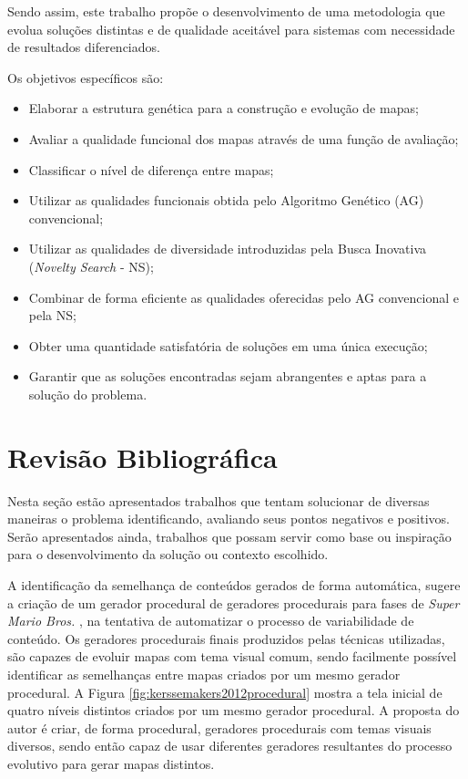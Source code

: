 Sendo assim, este trabalho propõe o desenvolvimento de uma metodologia que evolua soluções distintas e de qualidade aceitável para sistemas com necessidade de resultados diferenciados.

Os objetivos específicos são:

\vspace{-5mm}
\begin{itemize}[leftmargin=1.25\parindent]
    \item Elaborar a estrutura genética para a construção e evolução de mapas;
    \item Avaliar a qualidade funcional dos mapas através de uma função de avaliação;
    \item Classificar o nível de diferença entre mapas;
    \item Utilizar as qualidades funcionais obtida pelo Algoritmo Genético (AG) convencional;
    \item Utilizar as qualidades de diversidade introduzidas pela Busca Inovativa (\emph{Novelty Search} - NS);
    \item Combinar de forma eficiente as qualidades oferecidas pelo AG convencional e pela NS;
    \item Obter uma quantidade satisfatória de soluções em uma única execução;
    \item Garantir que as soluções encontradas sejam abrangentes e aptas para a solução do problema.
\end{itemize}

\section{Revisão Bibliográfica}

Nesta seção estão apresentados trabalhos que tentam solucionar de diversas maneiras o problema identificando, avaliando seus pontos negativos e positivos. Serão apresentados ainda, trabalhos que possam servir como base ou inspiração para o desenvolvimento da solução ou contexto escolhido.

A identificação da semelhança de conteúdos gerados de forma automática, \cite{kerssemakers2012procedural} sugere a criação  de um gerador procedural de geradores procedurais para fases de \emph{Super Mario Bros.} \cite{game:mario}, na tentativa de automatizar o processo de variabilidade de conteúdo. Os geradores procedurais finais produzidos pelas técnicas utilizadas, são capazes de evoluir mapas com tema visual comum, sendo facilmente possível identificar as semelhanças entre mapas criados por um mesmo gerador procedural. A Figura \ref{fig:kerssemakers2012procedural} mostra a tela inicial de quatro níveis distintos criados por um mesmo gerador procedural. A proposta do autor é criar, de forma procedural, geradores procedurais com temas visuais diversos, sendo então capaz de usar diferentes geradores resultantes do processo evolutivo para gerar mapas 
distintos.

